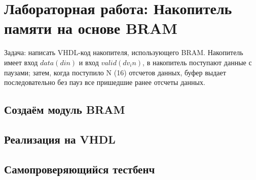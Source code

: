 \section{Лабораторная работа: Накопитель памяти на основе BRAM}

Задача: написать VHDL-код накопителя, использующего BRAM. Накопитель имеет вход $data(din)$ и вход $valid(dv_in)$, в накопитель поступают данные с паузами; затем, когда поступило N (16) отсчетов данных, буфер выдает последовательно без пауз все пришедшие ранее отсчеты данных.

\subsection{Создаём модуль BRAM}
\subsection{Реализация на VHDL}



\subsection{Самопроверяющийся тестбенч}

